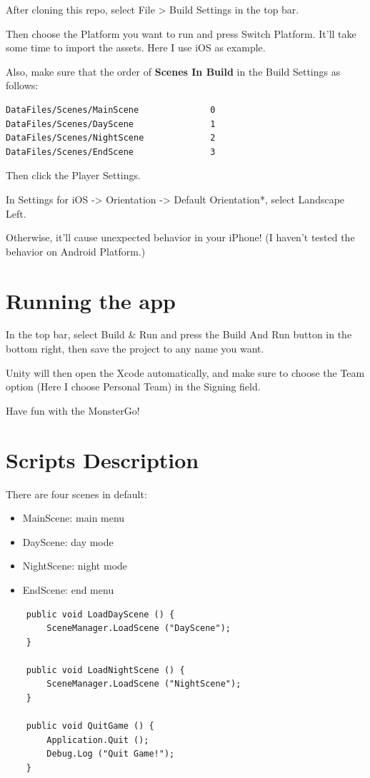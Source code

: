 \documentclass{article}
\newcommand{\tb}{\textbf}
\begin{document}
After cloning this repo, select File > Build Settings in the top bar.

Then choose the Platform you want to run and press Switch Platform. It'll take some time to import the assets. Here I use iOS as example.

Also, make sure that the order of \tb{Scenes In Build} in the Build Settings as follows:

\begin{lstlisting}
DataFiles/Scenes/MainScene              0
DataFiles/Scenes/DayScene               1
DataFiles/Scenes/NightScene             2
DataFiles/Scenes/EndScene               3
\end{lstlisting}

Then click the Player Settings.

In Settings for iOS -> Orientation -> Default Orientation*, select Landscape Left.

Otherwise, it'll cause unexpected behavior in your iPhone! (I haven't tested the behavior on Android Platform.)

\section*{Running the app}

In the top bar, select Build \& Run and press the Build And Run button in the bottom right, then save the project to any name you want.

Unity will then open the Xcode automatically, and make sure to choose the Team option (Here I choose Personal Team) in the Signing field.

Have fun with the MonsterGo!

\section*{Scripts Description}

There are four scenes in default:

\begin{itemize}
    \item MainScene: main menu
    \item DayScene: day mode
    \item NightScene: night mode
    \item EndScene: end menu
\end{itemize}

\begin{lstlisting}
    public void LoadDayScene () {
		SceneManager.LoadScene ("DayScene");
	}

	public void LoadNightScene () {
		SceneManager.LoadScene ("NightScene");
	}

	public void QuitGame () {
		Application.Quit ();
		Debug.Log ("Quit Game!");
	}
\end{lstlisting}
\end{document}

